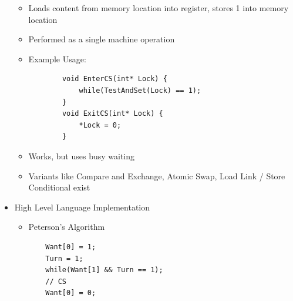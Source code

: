 \documentclass[10pt, landscape]{article}
\begin{document}
\begin{multicols*}{3}
\begin{itemize}
\begin{itemize}
        \item Loads content from memory location into register, stores 1 into memory location
        \item Performed as a single machine operation
        \item Example Usage:
        \begin{verbatim}
        void EnterCS(int* Lock) {
            while(TestAndSet(Lock) == 1);
        }
        void ExitCS(int* Lock) {
            *Lock = 0;
        }
        \end{verbatim}
        \item Works, but uses busy waiting
        \item Variants like Compare and Exchange, Atomic Swap, Load Link / Store Conditional exist
    \end{itemize}
    \item High Level Language Implementation
    \begin{itemize}
        \item Peterson's Algorithm
        \begin{verbatim}
    Want[0] = 1;
    Turn = 1;
    while(Want[1] && Turn == 1);
    // CS
    Want[0] = 0;


\end{verbatim}
\end{itemize}
\end{itemize}
\end{multicols*}
\end{document}
